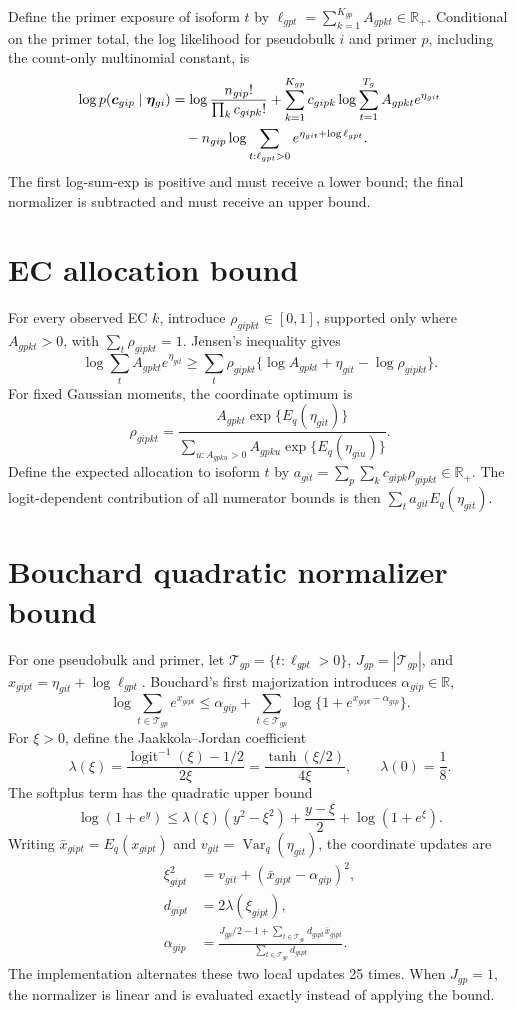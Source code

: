 \documentclass[11pt]{article}
\begin{document}
Define the primer exposure of isoform \(t\) by \(\ell_{gpt}=\sum_{k=1}^{K_{gp}}A_{gpkt}\in\mathbb R_+\). Conditional on the primer total, the log likelihood for pseudobulk \(i\) and primer \(p\), including the count-only multinomial constant, is \begin{align}
 \log p(\bm c_{gip}\mid\bm\eta_{gi})
 &=\log\frac{n_{gip}!}{\prod_kc_{gipk}!}
   +\sum_{k=1}^{K_{gp}}c_{gipk}
      \log\sum_{t=1}^{T_g}A_{gpkt}e^{\eta_{git}}\notag\\
 &\quad-n_{gip}\log\sum_{t:\ell_{gpt}>0}
      e^{\eta_{git}+\log\ell_{gpt}}.
\end{align}
The first log-sum-exp is positive and must receive a lower bound; the final normalizer is subtracted and must receive an upper bound.

\section{EC allocation bound}

For every observed EC \(k\), introduce \(\rho_{gipkt}\in[0,1]\), supported only where \(A_{gpkt}>0\), with \(\sum_t\rho_{gipkt}=1\). Jensen's inequality gives \[
 \log\sum_tA_{gpkt}e^{\eta_{git}}
 \geq\sum_t\rho_{gipkt}
 \{\log A_{gpkt}+\eta_{git}-\log\rho_{gipkt}\}.
\]
For fixed Gaussian moments, the coordinate optimum is \[
 \rho_{gipkt}
 =\frac{A_{gpkt}\exp\{E_q(\eta_{git})\}}
 {\sum_{u:A_{gpku}>0}A_{gpku}\exp\{E_q(\eta_{giu})\}}.
\]
Define the expected allocation to isoform \(t\) by \(a_{git}=\sum_p\sum_kc_{gipk}\rho_{gipkt}\in\mathbb R_+\). The logit-dependent contribution of all numerator bounds is then \(\sum_ta_{git}E_q(\eta_{git})\).

\section{Bouchard quadratic normalizer bound}

For one pseudobulk and primer, let \(\mathcal T_{gp}=\{t:\ell_{gpt}>0\}\), \(J_{gp}=|\mathcal T_{gp}|\), and \(x_{gipt}=\eta_{git}+\log\ell_{gpt}\). Bouchard's first majorization introduces \(\alpha_{gip}\in\mathbb R\), \[
 \log\sum_{t\in\mathcal T_{gp}}e^{x_{gipt}}
 \leq \alpha_{gip}+\sum_{t\in\mathcal T_{gp}}
 \log\{1+e^{x_{gipt}-\alpha_{gip}}\}.
\]
For \(\xi>0\), define the Jaakkola--Jordan coefficient \[
 \lambda(\xi)=\frac{\operatorname{logit}^{-1}(\xi)-1/2}{2\xi}
 =\frac{\tanh(\xi/2)}{4\xi},
 \qquad \lambda(0)=\frac18.
\]
The softplus term has the quadratic upper bound \[
 \log(1+e^y)
 \leq\lambda(\xi)(y^2-\xi^2)
 +\frac{y-\xi}{2}+\log(1+e^\xi).
\]
Writing \(\bar x_{gipt}=E_q(x_{gipt})\) and \(v_{git}=\operatorname{Var}_q(\eta_{git})\), the coordinate updates are \begin{align}
 \xi_{gipt}^2
 &=v_{git}+(\bar x_{gipt}-\alpha_{gip})^2,\\
 d_{gipt}&=2\lambda(\xi_{gipt}),\\
 \alpha_{gip}
 &=\frac{J_{gp}/2-1+\sum_{t\in\mathcal T_{gp}}d_{gipt}\bar x_{gipt}}
 {\sum_{t\in\mathcal T_{gp}}d_{gipt}}.
\end{align}
The implementation alternates these two local updates 25 times. When \(J_{gp}=1\), the normalizer is linear and is evaluated exactly instead of applying the bound.
\end{document}
